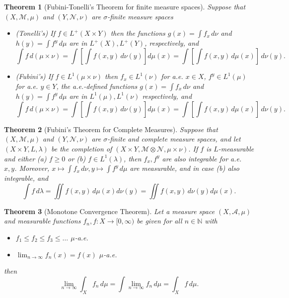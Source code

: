 \documentclass[11pt, letter]{book}
\newtheorem{theorem}{Theorem}[section]
\newcommand{\lb}{\left[}
\newcommand{\rb}{\right]}
\begin{document}
\begin{theorem}[Fubini-Tonelli's Theorem for finite measure spaces]\label{thm:Fubini-Tonelli-OG}
Suppose that $(X,\mathcal{M},\mu)$ and $(Y,\mathcal{N},\nu)$ are $\sigma$-finite measure spaces
\begin{itemize}
    \item (Tonelli's) If $f \in L^+(X\times Y)$ then the functions $g(x) =\int f_x\,d\nu$ and $h(y) = \int f^y \,d\mu$ are in $L^+(X), L^+(Y)$, respectively, and
    \begin{equation*}
        \int f \,d(\mu\times \nu) = \int \lb \int f(x,y)\,d\nu(y) \rb d\mu(x) = \int \lb \int f(x,y)\,d\mu(x) \rb \,d\nu(y).
    \end{equation*}
    
    \item (Fubini's) If $f \in L^1(\mu\times \nu)$ then $f_x \in L^1(\nu)$ for a.e. $x\in X$,  $f^y \in L^1(\mu)$ for a.e. $y\in Y$, the a.e.-defined functions $g(x) = \int f_x\,d\nu$ and $h(y) = \int f^y\,d\mu$ are in $L^1(\mu),L^1(\nu)$ respectively, and   
    \begin{equation*}
        \int f \,d(\mu\times \nu) = \int \lb \int f(x,y)\,d\nu(y) \rb d\mu(x) = \int \lb \int f(x,y)\,d\mu(x) \rb \,d\nu(y).
    \end{equation*}
\end{itemize}
\end{theorem}

\begin{theorem}[Fubini's Theorem for Complete Measures]
Suppose that $(X,\mathcal{M},\mu)$ and $(Y,\mathcal{N},\nu)$ are $\sigma$-finite and complete measure spaces, and let $(X\times Y, L, \lambda)$ be the completion of $(X\times Y, \mathcal{M}\otimes \mathcal{N}, \mu\times \nu)$. If $f$ is $L$-measurable and either (a) $f\geq 0$ or (b) $f\in L^1(\lambda)$, then $f_x,f^y$ are also integrable for a.e. $x,y$. Moreover, $x\mapsto \int f_x\,d\nu, y\mapsto \int f^y\,d\mu$ are measurable, and in case (b) also integrable, and
\begin{equation*}
    \int f\,d\lambda = \iint f(x,y)\,d\mu(x)d\nu(y) = \iint f(x,y)\,d\nu(y)d\mu(x) .
\end{equation*}
\end{theorem}

\begin{theorem}[Monotone Convergence Theorem]
Let a measure space $(X,\mathcal{A},\mu)$ and measurable functions $f_n,f: X\to [0,\infty)$ be given for all $n\in \mathbb{N}$ with
\begin{itemize}
    \item $f_1\leq f_2 \leq f_3 \leq \dots $ $\mu$-a.e.
    \item $\lim_{n\to \infty}f_n(x) = f(x)$ $\mu$-a.e. 
\end{itemize}
then 
\begin{equation*}
    \lim_{n\to \infty} \int_X f_n \,d\mu = \int \lim_{n\to \infty} f_n \,d\mu = \int_X f\,d\mu.
\end{equation*}
\end{theorem}
\end{document}
